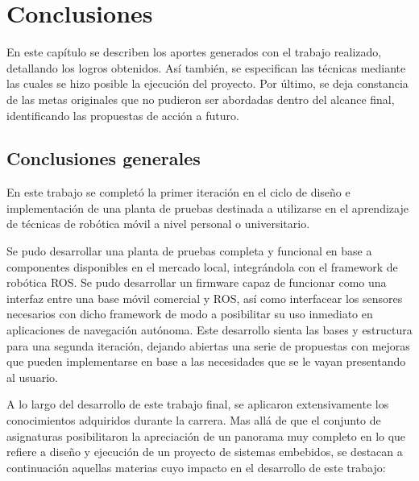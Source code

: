

\chapter{Conclusiones} %

En este capítulo se describen los aportes generados con el trabajo realizado, detallando los logros obtenidos. Así también, se especifican las técnicas mediante las cuales se hizo posible la ejecución del proyecto. Por último, se deja constancia de las metas originales que no pudieron ser abordadas dentro del alcance final, identificando las propuestas de acción a futuro.

\label{Chapter5} %



\section{Conclusiones generales}

En este trabajo se completó la primer iteración en el ciclo de diseño e implementación de una planta de pruebas destinada a utilizarse en el aprendizaje de técnicas de robótica móvil a nivel personal o universitario.

Se pudo desarrollar una planta de pruebas completa y funcional en base a componentes disponibles en el mercado local, integrándola con el framework de robótica ROS. Se pudo desarrollar un firmware capaz de funcionar como una interfaz entre una base móvil comercial y ROS, así como interfacear los sensores necesarios con dicho framework de modo a posibilitar su uso inmediato en aplicaciones de navegación autónoma. Este desarrollo sienta las bases y estructura para una segunda iteración, dejando abiertas una serie de propuestas con mejoras que pueden implementarse en base a las necesidades que se le vayan presentando al usuario.

A lo largo del desarrollo de este trabajo final, se aplicaron extensivamente los conocimientos adquiridos durante la carrera. Mas allá de que el conjunto de asignaturas posibilitaron la apreciación de un panorama muy completo en lo que refiere a diseño y ejecución de un proyecto de sistemas embebidos, se destacan a continuación aquellas materias cuyo impacto en el desarrollo de este trabajo:



